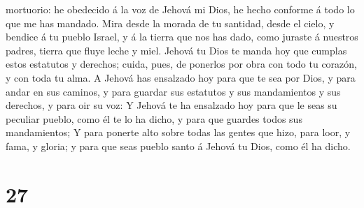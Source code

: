 mortuorio: he obedecido á la voz de Jehová mi Dios, he hecho conforme á
todo lo que me has mandado.  Mira desde la morada de tu
santidad, desde el cielo, y bendice á tu pueblo Israel, y á la tierra
que nos has dado, como juraste á nuestros padres, tierra que fluye leche
y miel.  Jehová tu Dios te manda hoy que cumplas estos
estatutos y derechos; cuida, pues, de ponerlos por obra con todo tu
corazón, y con toda tu alma.  A Jehová has ensalzado hoy
para que te sea por Dios, y para andar en sus caminos, y para guardar
sus estatutos y sus mandamientos y sus derechos, y para oir su voz:
 Y Jehová te ha ensalzado hoy para que le seas su
peculiar pueblo, como él te lo ha dicho, y para que guardes todos sus
mandamientos;  Y para ponerte alto sobre todas las gentes
que hizo, para loor, y fama, y gloria; y para que seas pueblo santo á
Jehová tu Dios, como él ha dicho.

\hypertarget{section-26}{%
\section{27}\label{section-26}}

